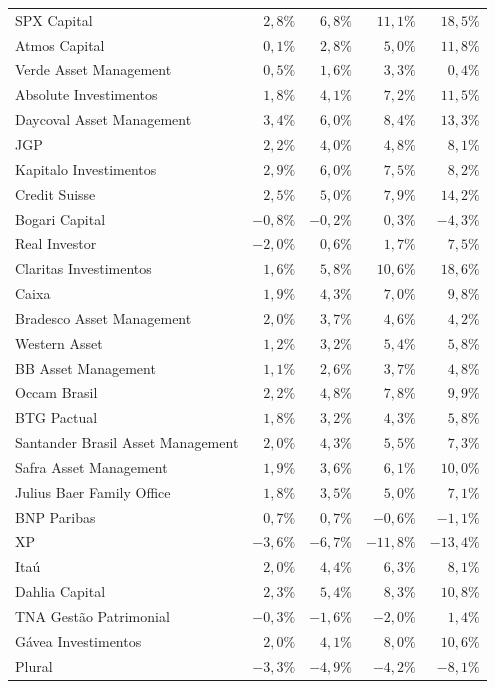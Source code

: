 \documentclass[11pt,a4paper]{article}
\begin{document}
\begin{center}
\begin{longtable}{@{}lrrrr@{}}
SPX Capital & $2{,}8\%$ & $6{,}8\%$ & $11{,}1\%$ & $18{,}5\%$ \\
Atmos Capital & $0{,}1\%$ & $2{,}8\%$ & $5{,}0\%$ & $11{,}8\%$ \\
Verde Asset Management & $0{,}5\%$ & $1{,}6\%$ & $3{,}3\%$ & $0{,}4\%$ \\
Absolute Investimentos & $1{,}8\%$ & $4{,}1\%$ & $7{,}2\%$ & $11{,}5\%$ \\
Daycoval Asset Management & $3{,}4\%$ & $6{,}0\%$ & $8{,}4\%$ & $13{,}3\%$ \\
JGP & $2{,}2\%$ & $4{,}0\%$ & $4{,}8\%$ & $8{,}1\%$ \\
Kapitalo Investimentos & $2{,}9\%$ & $6{,}0\%$ & $7{,}5\%$ & $8{,}2\%$ \\
Credit Suisse & $2{,}5\%$ & $5{,}0\%$ & $7{,}9\%$ & $14{,}2\%$ \\
Bogari Capital & $-0{,}8\%$ & $-0{,}2\%$ & $0{,}3\%$ & $-4{,}3\%$ \\
Real Investor & $-2{,}0\%$ & $0{,}6\%$ & $1{,}7\%$ & $7{,}5\%$ \\
Claritas Investimentos & $1{,}6\%$ & $5{,}8\%$ & $10{,}6\%$ & $18{,}6\%$ \\
Caixa & $1{,}9\%$ & $4{,}3\%$ & $7{,}0\%$ & $9{,}8\%$ \\
Bradesco Asset Management & $2{,}0\%$ & $3{,}7\%$ & $4{,}6\%$ & $4{,}2\%$ \\
Western Asset & $1{,}2\%$ & $3{,}2\%$ & $5{,}4\%$ & $5{,}8\%$ \\
BB Asset Management & $1{,}1\%$ & $2{,}6\%$ & $3{,}7\%$ & $4{,}8\%$ \\
Occam Brasil & $2{,}2\%$ & $4{,}8\%$ & $7{,}8\%$ & $9{,}9\%$ \\
BTG Pactual & $1{,}8\%$ & $3{,}2\%$ & $4{,}3\%$ & $5{,}8\%$ \\
Santander Brasil Asset Management & $2{,}0\%$ & $4{,}3\%$ & $5{,}5\%$ & $7{,}3\%$ \\
Safra Asset Management & $1{,}9\%$ & $3{,}6\%$ & $6{,}1\%$ & $10{,}0\%$ \\
Julius Baer Family Office & $1{,}8\%$ & $3{,}5\%$ & $5{,}0\%$ & $7{,}1\%$ \\
BNP Paribas & $0{,}7\%$ & $0{,}7\%$ & $-0{,}6\%$ & $-1{,}1\%$ \\
XP & $-3{,}6\%$ & $-6{,}7\%$ & $-11{,}8\%$ & $-13{,}4\%$ \\
Itaú & $2{,}0\%$ & $4{,}4\%$ & $6{,}3\%$ & $8{,}1\%$ \\
Dahlia Capital & $2{,}3\%$ & $5{,}4\%$ & $8{,}3\%$ & $10{,}8\%$ \\
TNA Gestão Patrimonial & $-0{,}3\%$ & $-1{,}6\%$ & $-2{,}0\%$ & $1{,}4\%$ \\
Gávea Investimentos & $2{,}0\%$ & $4{,}1\%$ & $8{,}0\%$ & $10{,}6\%$ \\
Plural & $-3{,}3\%$ & $-4{,}9\%$ & $-4{,}2\%$ & $-8{,}1\%$ \\
\end{longtable}
\end{center}
\end{document}
